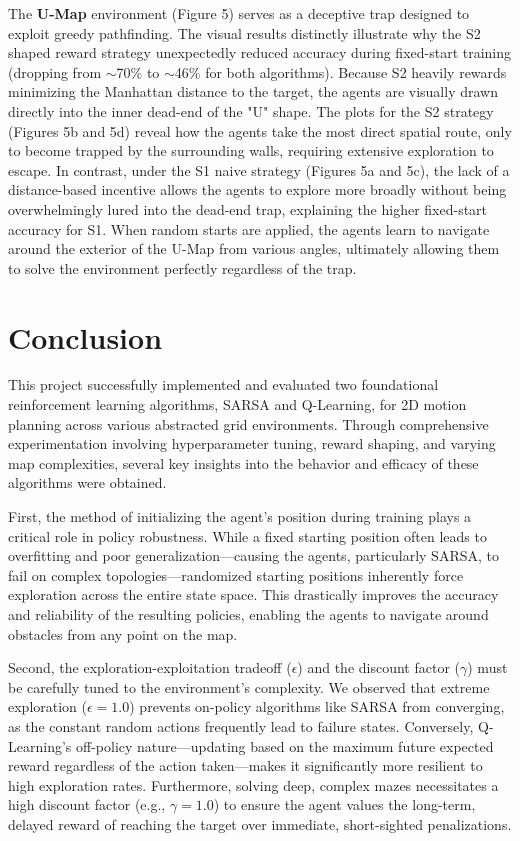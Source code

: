 \documentclass{article}
\begin{document}
The \textbf{U-Map} environment (Figure 5) serves as a deceptive trap designed to exploit greedy pathfinding. The visual results distinctly illustrate why the S2 shaped reward strategy unexpectedly reduced accuracy during fixed-start training (dropping from $\sim$70\% to $\sim$46\% for both algorithms). Because S2 heavily rewards minimizing the Manhattan distance to the target, the agents are visually drawn directly into the inner dead-end of the "U" shape. The plots for the S2 strategy (Figures 5b and 5d) reveal how the agents take the most direct spatial route, only to become trapped by the surrounding walls, requiring extensive exploration to escape. In contrast, under the S1 naive strategy (Figures 5a and 5c), the lack of a distance-based incentive allows the agents to explore more broadly without being overwhelmingly lured into the dead-end trap, explaining the higher fixed-start accuracy for S1. When random starts are applied, the agents learn to navigate around the exterior of the U-Map from various angles, ultimately allowing them to solve the environment perfectly regardless of the trap.

\section{Conclusion}
This project successfully implemented and evaluated two foundational reinforcement learning algorithms, SARSA and Q-Learning, for 2D motion planning across various abstracted grid environments. Through comprehensive experimentation involving hyperparameter tuning, reward shaping, and varying map complexities, several key insights into the behavior and efficacy of these algorithms were obtained.

First, the method of initializing the agent's position during training plays a critical role in policy robustness. While a fixed starting position often leads to overfitting and poor generalization—causing the agents, particularly SARSA, to fail on complex topologies—randomized starting positions inherently force exploration across the entire state space. This drastically improves the accuracy and reliability of the resulting policies, enabling the agents to navigate around obstacles from any point on the map.

Second, the exploration-exploitation tradeoff ($\epsilon$) and the discount factor ($\gamma$) must be carefully tuned to the environment's complexity. We observed that extreme exploration ($\epsilon=1.0$) prevents on-policy algorithms like SARSA from converging, as the constant random actions frequently lead to failure states. Conversely, Q-Learning's off-policy nature—updating based on the maximum future expected reward regardless of the action taken—makes it significantly more resilient to high exploration rates. Furthermore, solving deep, complex mazes necessitates a high discount factor (e.g., $\gamma=1.0$) to ensure the agent values the long-term, delayed reward of reaching the target over immediate, short-sighted penalizations.
\end{document}
